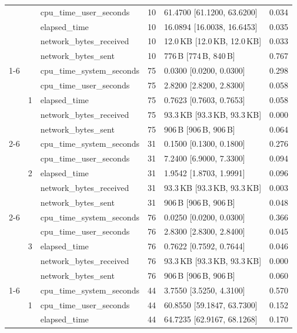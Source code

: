 \begin{tabular}{lllrll}
 &  & cpu_time_user_seconds & 10 & 61.4700 [61.1200, 63.6200] & 0.034 \\
 &  & elapsed_time & 10 & 16.0894 [16.0038, 16.6453] & 0.035 \\
 &  & network_bytes_received & 10 & 12.0\,KB [12.0\,KB, 12.0\,KB] & 0.033 \\
 &  & network_bytes_sent & 10 & 776\,B [774\,B, 840\,B] & 0.767 \\
\cline{1-6} \cline{2-6}
\multirow[t]{15}{*}{knn-search-duckdb-small} & \multirow[t]{5}{*}{1} & cpu_time_system_seconds & 75 & 0.0300 [0.0200, 0.0300] & 0.298 \\
 &  & cpu_time_user_seconds & 75 & 2.8200 [2.8200, 2.8300] & 0.058 \\
 &  & elapsed_time & 75 & 0.7623 [0.7603, 0.7653] & 0.058 \\
 &  & network_bytes_received & 75 & 93.3\,KB [93.3\,KB, 93.3\,KB] & 0.000 \\
 &  & network_bytes_sent & 75 & 906\,B [906\,B, 906\,B] & 0.064 \\
\cline{2-6}
 & \multirow[t]{5}{*}{2} & cpu_time_system_seconds & 31 & 0.1500 [0.1300, 0.1800] & 0.276 \\
 &  & cpu_time_user_seconds & 31 & 7.2400 [6.9000, 7.3300] & 0.094 \\
 &  & elapsed_time & 31 & 1.9542 [1.8703, 1.9991] & 0.096 \\
 &  & network_bytes_received & 31 & 93.3\,KB [93.3\,KB, 93.3\,KB] & 0.003 \\
 &  & network_bytes_sent & 31 & 906\,B [906\,B, 906\,B] & 0.048 \\
\cline{2-6}
 & \multirow[t]{5}{*}{3} & cpu_time_system_seconds & 76 & 0.0250 [0.0200, 0.0300] & 0.366 \\
 &  & cpu_time_user_seconds & 76 & 2.8300 [2.8300, 2.8400] & 0.045 \\
 &  & elapsed_time & 76 & 0.7622 [0.7592, 0.7644] & 0.046 \\
 &  & network_bytes_received & 76 & 93.3\,KB [93.3\,KB, 93.3\,KB] & 0.000 \\
 &  & network_bytes_sent & 76 & 906\,B [906\,B, 906\,B] & 0.060 \\
\cline{1-6} \cline{2-6}
\multirow[t]{15}{*}{knn-search-local-small} & \multirow[t]{5}{*}{1} & cpu_time_system_seconds & 44 & 3.7550 [3.5250, 4.3100] & 0.570 \\
 &  & cpu_time_user_seconds & 44 & 60.8550 [59.1847, 63.7300] & 0.152 \\
 &  & elapsed_time & 44 & 64.7235 [62.9167, 68.1268] & 0.170 \\

\end{tabular}
